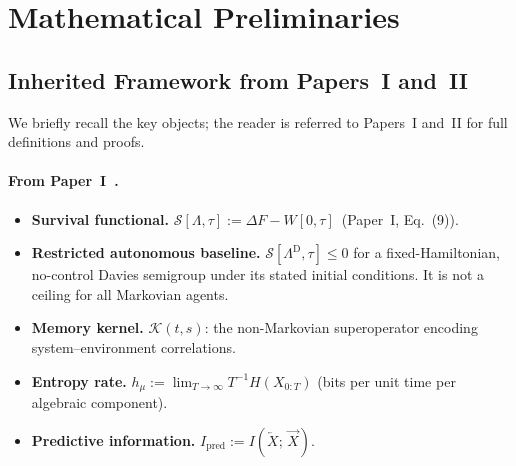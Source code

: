\documentclass[12pt]{article}
\begin{document}
\section{Mathematical Preliminaries}
\label{sec:prelim}

\subsection{Inherited Framework from Papers~I and~II}
\label{subsec:inherited}

We briefly recall the key objects; the reader is referred to
Papers~I and~II for full definitions and proofs.

\paragraph{From Paper~I~\cite{Liu2026TDOME_I}.}
\begin{itemize}
\item \textbf{Survival functional.}
  $\mathcal{S}[\Lambda,\tau]
  := \Delta F - W[0,\tau]$~(Paper~I,
  Eq.~(9)).
\item \textbf{Restricted autonomous baseline.}
  $\mathcal{S}[\Lambda^{\mathrm{D}},\tau]\leq0$ for a fixed-Hamiltonian,
  no-control Davies semigroup under its stated initial conditions.  It
  is not a ceiling for all Markovian agents.
\item \textbf{Memory kernel.}
  $\mathcal{K}(t,s)$: the non-Markovian superoperator
  encoding system--environment correlations.
\item \textbf{Entropy rate.}
  $h_\mu := \lim_{T\to\infty}T^{-1}H(X_{0:T})$ (bits per
  unit time per algebraic component).
\item \textbf{Predictive information.}
  $I_{\mathrm{pred}}
  := I(\overleftarrow{X};\,\overrightarrow{X})$.
\end{itemize}
\end{document}
